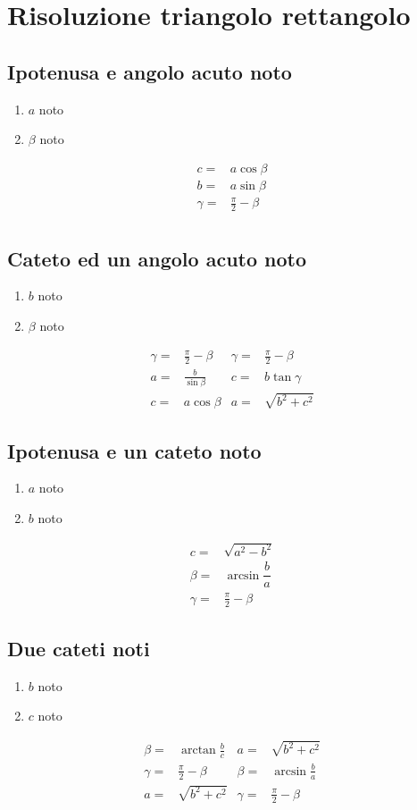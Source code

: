 \section{Risoluzione triangolo rettangolo}
\begin{center}
	
\end{center}
\subsection{Ipotenusa e angolo acuto noto}
\begin{enumerate}
	\item $a$ noto
	\item $\beta$ noto
\end{enumerate}
\begin{align*}
c=&a\cos\beta\\
b=&a\sin\beta\\
\gamma=&\frac{\pi}{2}-\beta\\
\end{align*}
\subsection{Cateto ed un angolo acuto noto}
\begin{enumerate}
	\item $b$ noto
	\item $\beta$ noto
\end{enumerate}
\begin{align*}
\gamma=&\frac{\pi}{2}-\beta&\gamma=&\frac{\pi}{2}-\beta\\
a=&\frac{b}{\sin\beta}&c=&b\tan\gamma\\
c=&a\cos\beta&a=&\sqrt{b^2+c^2}
\end{align*}
\subsection{Ipotenusa e un cateto noto}
\begin{enumerate}
	\item $a$ noto
	\item $b$ noto
\end{enumerate}
\begin{align*}
c=&\sqrt{a^2-b^2}\\
\beta=&\arcsin\dfrac{b}{a}\\
\gamma=&\frac{\pi}{2}-\beta
\end{align*}
\subsection{Due cateti noti}
\begin{enumerate}
	\item $b$ noto
	\item $c$ noto
\end{enumerate}
\begin{align*}
\beta=&\arctan\frac{b}{c}&a=&\sqrt{b^2+c^2}\\
\gamma=&\frac{\pi}{2}-\beta&\beta=&\arcsin\frac{b}{a}\\
a=&\sqrt{b^2+c^2}&\gamma=&\frac{\pi}{2}-\beta\\
\end{align*}